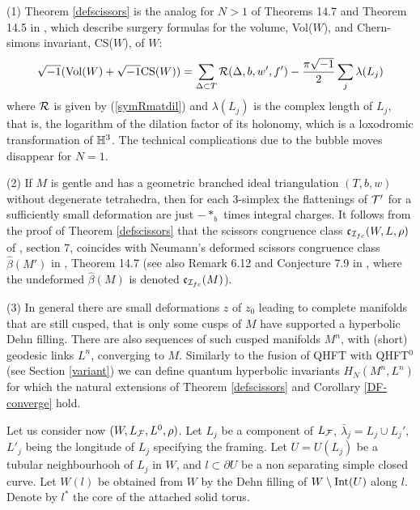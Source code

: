 \begin{remarks}\label{CS-surg}
{\rm (1) Theorem \ref{defscissors} is the analog for $N>1$ of Theorems
  14.7 and Theorem 14.5 in \cite{N}, which describe surgery formulas
  for the volume, Vol($W$), and Chern-simons invariant, CS($W$), of
  $W$:
$$\sqrt{-1}({\rm Vol}(W) + \sqrt{-1} {\rm CS}(W)) = \sum_{\Delta
  \subset T} \mathcal{R}(\Delta,b,w',f')-\frac{\pi\sqrt{-1}}{2}
\sum_j \lambda(L_j)$$ where ${\mathcal R}$ is given by (\ref{symRmatdil})
and $\lambda(L_j)$ is the complex length of $L_j$, that is, the logarithm of
the dilation factor of its holonomy, which is a loxodromic
transformation of $\mathbb{H}^3$. The technical complications due to the bubble
moves disappear for $N=1$.
\smallskip

(2) If $M$ is gentle and has a geometric branched ideal
triangulation $(T,b,w)$ without degenerate tetrahedra, then for each
$3$-simplex the flattenings of ${\mathcal T}'$ for a sufficiently small
deformation are just $-*_b$ times integral charges. It follows from
the proof of Theorem \ref{defscissors} that the scissors congruence
class $\mathfrak{c}_{{\mathcal I}_{fc}}(W,L,\rho)$ of \cite{BB2}, section 7,
coincides with Neumann's deformed scissors congruence class
$\hat{\beta}(M')$ in \cite{N}, Theorem 14.7 (see also Remark 6.12 and
Conjecture 7.9 in \cite{BB2}, where the undeformed $\hat{\beta}(M)$ is
denoted $\mathfrak{c}_{{\mathcal I}_{fc}}(M)$).
\smallskip

(3) In general there are small deformations $z$ of $z_0$ leading to
complete manifolds that are still cusped, that is only some cusps of
$M$ have supported a hyperbolic Dehn filling. There are also sequences
of such cusped manifolds $M^n$, with (short) geodesic links $L^n$,
converging to $M$. Similarly to the fusion of QHFT with QHFT$^0$
(see Section \ref{variant}) we can define quantum hyperbolic
invariants $H_N(M^n,L^n)$ for which the natural extensions of Theorem
\ref{defscissors} and Corollary \ref{DF-converge} hold.}
\end{remarks}
Let us consider now $(W,L_{\mathcal F},L^0,\rho)$. Let $L_j$ be a component
of $L_{\mathcal F}$, $\bar \lambda_j = L_j \cup L_j'$, $L'_j$ being
the longitude of $L_j$ specifying the framing. Let $U=U(L_j)$
be a tubular neighbourhooh of $L_j$ in $W$, and $l\subset \partial U$
be a non separating simple closed curve. Let $W(l)$ be obtained from
$W$ by the Dehn filling of $W\setminus {\rm Int}(U)$ along $l$. Denote by $l^*$
the core of the attached solid torus.
